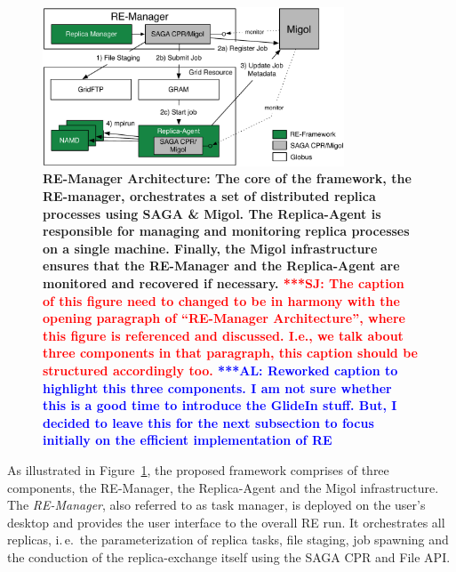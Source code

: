 \documentclass{rspublic}
\newcommand{\alnote}[1]{ {\textcolor{blue} { ***AL: #1 }}}
\newcommand{\jhanote}[1]{ {\textcolor{red} { ***SJ: #1 }}}
\newcommand{\alnote}[1]{}
\newcommand{\jhanote}[1]{}
\begin{document}
\begin{figure}[t]
      \centering
          \includegraphics[width=0.8\textwidth]{REMDgManager-architecture.pdf}
          \caption{\footnotesize \bf RE-Manager Architecture: The
            core of the framework, the RE-manager, orchestrates 
            a set of distributed replica processes using SAGA \& Migol. 
            The Replica-Agent is responsible for managing and monitoring 
            replica processes on a single machine. Finally, the Migol 
            infrastructure ensures that the RE-Manager and the Replica-Agent 
            are monitored and recovered if necessary.            
            \jhanote{The caption of this
              figure need to changed to be in harmony with the opening
              paragraph of ``RE-Manager Architecture'', where this
              figure is referenced and discussed. I.e., we talk about
              three components in that paragraph, this caption should
              be structured accordingly too.}
              \alnote{Reworked caption to highlight this three components. 
              I am not sure whether this is a good time to introduce the GlideIn stuff. But, I 
              decided to leave this for the next subsection to focus initially on
              the efficient implementation of RE}
              }
      \label{fig:REMD-Manager-architecture}
\end{figure}

As illustrated in Figure~\ref{fig:REMD-Manager-architecture}, the
proposed framework comprises of three components, the RE-Manager,
the Replica-Agent and the Migol infrastructure. 
The  \emph{RE-Manager}, also referred to as task manager,
is deployed on the user's desktop and provides the user interface 
to the overall RE run. It orchestrates all replicas, i.\,e.\ the 
parameterization of replica  tasks, file staging, job spawning 
and the conduction of the replica-exchange itself using the SAGA CPR
and File API.                                                                
\end{document}
